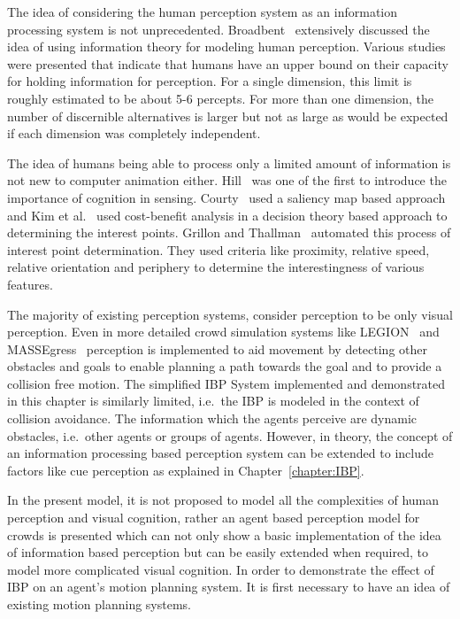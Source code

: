 The idea of considering the human perception system as an information processing system is not unprecedented. Broadbent~\cite{Broadbent:1965is} extensively discussed the idea of using information theory for modeling human perception. Various studies were presented that indicate that humans have an upper bound on their capacity for holding information for perception. For a single dimension, this limit is roughly estimated to be about 5-6 percepts. For more than one dimension, the number of discernible alternatives is larger but not as large as would be expected if each dimension was completely independent.

The idea of humans being able to process only a limited amount of information is not new to computer animation either. Hill~\cite{Hill:1999ww} was one of the first to introduce the importance of cognition in sensing. Courty~\cite{Courty:2003hy} used a saliency map based approach and Kim et al.~\cite{Kim:2005ub} used cost-benefit analysis in a decision theory based approach to determining the interest points. Grillon and Thallman~\cite{Grillon:2009hf} automated this process of interest point determination. They used criteria like proximity, relative speed, relative orientation and periphery to determine the interestingness of various features.

The majority of existing perception systems, consider perception to be only visual perception. Even in more detailed crowd simulation systems like LEGION~\cite{Still:2000tp} and MASSEgress~\cite{Pan:2006vp} perception is implemented to aid movement by detecting other obstacles and goals to enable planning a path towards the goal and to provide a collision free motion. The simplified IBP System implemented and demonstrated in this chapter is similarly limited, i.e.\ the IBP is modeled in the context of collision avoidance. The information which the agents perceive are dynamic obstacles, i.e.\ other agents or groups of agents. However, in theory, the concept of an information processing based perception system can be extended to include factors like cue perception as explained in Chapter~\ref{chapter:IBP}.

In the present model, it is not proposed to model all the complexities of human perception and visual cognition, rather an agent based perception model for crowds is presented which can not only show a basic implementation of the idea of information based perception but can be easily extended when required, to model more complicated visual cognition. In order to demonstrate the effect of IBP on an agent's motion planning system. It is first necessary to have an idea of existing motion planning systems.

